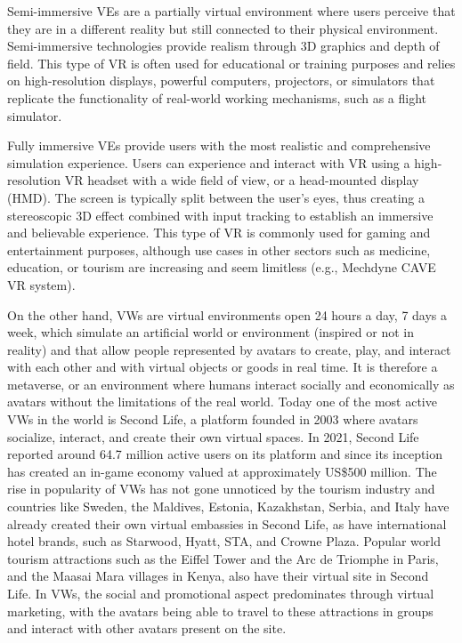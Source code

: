 \documentclass[
  letterpaper,
  DIV=11,
  numbers=noendperiod]{scrreprt}
\begin{document}
Semi-immersive VEs are a partially virtual environment where users
perceive that they are in a different reality but still connected to
their physical environment. Semi-immersive technologies provide realism
through 3D graphics and depth of field. This type of VR is often used
for educational or training purposes and relies on high-resolution
displays, powerful computers, projectors, or simulators that replicate
the functionality of real-world working mechanisms, such as a flight
simulator.

Fully immersive VEs provide users with the most realistic and
comprehensive simulation experience. Users can experience and interact
with VR using a high-resolution VR headset with a wide field of view, or
a head-mounted display (HMD). The screen is typically split between the
user's eyes, thus creating a stereoscopic 3D effect combined with input
tracking to establish an immersive and believable experience. This type
of VR is commonly used for gaming and entertainment purposes, although
use cases in other sectors such as medicine, education, or tourism are
increasing and seem limitless (e.g., Mechdyne CAVE VR system).

On the other hand, VWs are virtual environments open 24 hours a day, 7
days a week, which simulate an artificial world or environment (inspired
or not in reality) and that allow people represented by avatars to
create, play, and interact with each other and with virtual objects or
goods in real time. It is therefore a metaverse, or an environment where
humans interact socially and economically as avatars without the
limitations of the real world. Today one of the most active VWs in the
world is Second Life, a platform founded in 2003 where avatars
socialize, interact, and create their own virtual spaces. In 2021,
Second Life reported around 64.7 million active users on its platform
and since its inception has created an in-game economy valued at
approximately US\$500 million. The rise in popularity of VWs has not
gone unnoticed by the tourism industry and countries like Sweden, the
Maldives, Estonia, Kazakhstan, Serbia, and Italy have already created
their own virtual embassies in Second Life, as have international hotel
brands, such as Starwood, Hyatt, STA, and Crowne Plaza. Popular world
tourism attractions such as the Eiffel Tower and the Arc de Triomphe in
Paris, and the Maasai Mara villages in Kenya, also have their virtual
site in Second Life. In VWs, the social and promotional aspect
predominates through virtual marketing, with the avatars being able to
travel to these attractions in groups and interact with other avatars
present on the site.
\end{document}
